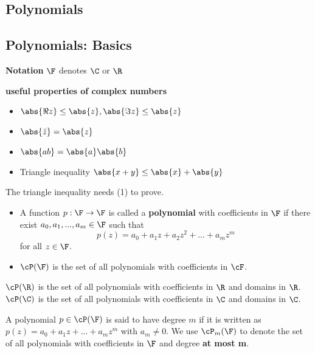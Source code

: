 \begin{refsection}
\section{Polynomials}
\subsection{Polynomials: Basics}
\begin{mdframed}
\textbf{Notation}
$\F$ denotes $\C$ or $\R$
\end{mdframed}
\begin{mdframed}
\cite[118]{axler2015linear}\textbf{useful properties of complex numbers}
\begin{itemize}
    \item $\abs{\Re z} \leq \abs{z}, \abs{\Im z} \leq \abs{z}$
    \item $\abs{\bar{z}} = \abs{z}$
    \item $\abs{ab} = \abs{a}\abs{b}$
    \item Triangle inequality $\abs{x+y}\leq \abs{x} + \abs{y}$
\end{itemize}
The triangle inequality needs (1) to prove. 
\end{mdframed}

\begin{definition}[polynomials]
\cite[31]{axler2015linear}
\begin{itemize}
    \item A function $p:\F\to\F$ is called a \textbf{polynomial} with coefficients in $\F$ if there exist $a_0,a_1,...,a_m \in \F$ such that 
    $$p(z) = a_0 + a_1 z + a_2 z^2 + ... + a_m z^m$$
    for all $z\in \F$.
    \item $\cP(\F)$ is the set of all polynomials with coefficients in $\cF$.
\end{itemize}
\end{definition}

\begin{definition}
$\cP(\R)$ is the set of all polynomials with coefficients in $\R$ and domains in $\R$.
$\cP(\C)$ is the set of all polynomials with coefficients in $\C$ and domains in $\C$.
\end{definition}

\begin{definition}
A polynomial $p\in \cP(\F)$ is said to have degree $m$ if it is written as
    $p(z) = a_0 + a_1 z + ... + a_m z^m$
    with $a_m \neq 0$.
    We use $\cP_m(\F)$ to denote the set of all polynomials with coefficients in $\F$ and degree \textbf{at most m}.
\end{definition}



\end{refsection}
